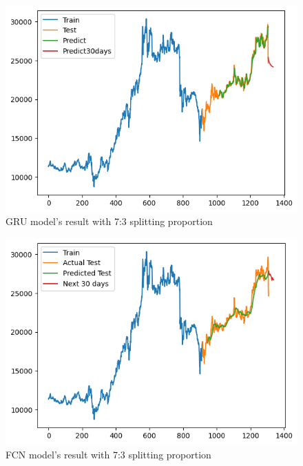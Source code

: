 \documentclass{ieeeojies}
\begin{document}
\begin{figure}[H]
  \centering
  \begin{minipage}{0.6\linewidth}
    \centering
    \includegraphics[width=\linewidth]{bibliography/diagram/GRU-ACB.png}
    \caption{GRU model’s result with 7:3 splitting proportion}
    \label{fig8}
  \end{minipage}
\end{figure}

\begin{figure}[H]
  \centering
  \begin{minipage}{0.6\linewidth}
    \centering
    \includegraphics[width=\linewidth]{bibliography/diagram/FCN-ACB.png}
    \caption{FCN model’s result with 7:3 splitting proportion}
    \label{fig8}
  \end{minipage}
\end{figure}
\end{document}
